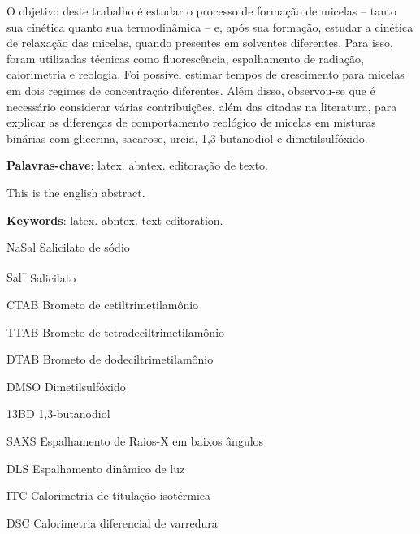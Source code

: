 \documentclass[
	12pt,				%
	openright,			%
	twoside,			%
	a4paper,			%
	english,			%
	brazil%
	]{abntex2}
\newcommand{\Sal}{Sal\textsuperscript{--}}
\begin{document}
\setlength{\absparsep}{18pt} %
\begin{resumo}
 O objetivo deste trabalho é estudar o processo de formação de micelas -- tanto sua cinética quanto sua termodinâmica -- e, após sua formação, estudar a cinética de relaxação das micelas, quando presentes em solventes diferentes. Para isso, foram utilizadas técnicas como fluorescência, espalhamento de radiação, calorimetria e reologia. Foi possível estimar tempos de crescimento para micelas em dois regimes de concentração diferentes. Além disso, observou-se que é necessário considerar várias contribuições, além das citadas na literatura, para explicar as diferenças de comportamento reológico de micelas em misturas binárias com glicerina, sacarose, ureia, 1,3-butanodiol e dimetilsulfóxido.

 \textbf{Palavras-chave}: latex. abntex. editoração de texto.
\end{resumo}

\begin{resumo}[Abstract]
 \begin{english}
   This is the english abstract.

   \vspace{\onelineskip}
 
   \noindent 
   \textbf{Keywords}: latex. abntex. text editoration.
 \end{english}
\end{resumo}




\listoffigures*
\cleardoublepage

\listoftables*
\cleardoublepage

\begin{siglas}
  \item[NaSal] Salicilato de sódio
  \item[\Sal] Salicilato
  \item[CTAB] Brometo de cetiltrimetilamônio
  \item[TTAB] Brometo de tetradeciltrimetilamônio
  \item[DTAB] Brometo de dodeciltrimetilamônio
  \item[DMSO] Dimetilsulfóxido
  \item[13BD] 1,3-butanodiol
  \item[SAXS] Espalhamento de Raios-X em baixos ângulos
  \item[DLS] Espalhamento dinâmico de luz
  \item[ITC] Calorimetria de titulação isotérmica
  \item[DSC] Calorimetria diferencial de varredura
\end{siglas}
\end{document}
